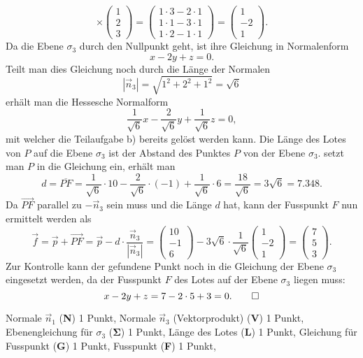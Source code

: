 \begin{loesung}
\[\times
\begin{pmatrix}1\\2\\3\end{pmatrix}
=
\begin{pmatrix}
1\cdot 3 - 2 \cdot 1 \\
1\cdot 1 - 3 \cdot 1\\ 
1\cdot 2 - 1 \cdot 1
\end{pmatrix}
=
\begin{pmatrix}
1\\-2\\1
\end{pmatrix}.
\]
Da die Ebene $\sigma_3$ durch den Nullpunkt geht, ist ihre Gleichung in Normalenform
\[
x-2y+z = 0.
\]
Teilt man dies Gleichung noch durch die Länge der Normalen
\[
|\vec n_3|
=
\sqrt{1^2+2^2 + 1^2}=\sqrt{6} 
\]
erhält man die Hessesche Normalform
\[
\dfrac{1}{\sqrt{6}}x-\dfrac{2}{\sqrt{6}}y+\dfrac{1}{\sqrt{6}}z = 0,
\]
mit welcher die Teilaufgabe b) bereits gelöst werden kann.
Die Länge des Lotes von $P$ auf die Ebene $\sigma_3$ ist der Abstand
des Punktes $P$ von der Ebene $\sigma_3$. setzt man $P$ in die Gleichung
ein, erhält man
\[
d = \overline{PF}
=
\dfrac{1}{\sqrt{6}}\cdot 10-\dfrac{2}{\sqrt{6}}\cdot (-1)+\dfrac{1}{\sqrt{6}} \cdot 6
= 
\dfrac{18}{\sqrt{6}}
=
3\sqrt{6}
=
7.348.
\]
Da $\overrightarrow{PF}$ parallel zu $-\vec n_3$ sein muss
und die Länge $d$ hat, kann
der Fusspunkt $F$ nun ermittelt werden als
\[
\vec f = \vec p + \overrightarrow{PF}
= \vec p - d \cdot \dfrac{\vec n_3}{|\vec n_3|}
=
\begin{pmatrix}
10\\ -1\\ 6
\end{pmatrix}
- 3\sqrt{6} \cdot \dfrac{1}{\sqrt{6}}
\begin{pmatrix}
1\\-2\\1
\end{pmatrix}
=
\begin{pmatrix}
7\\5\\3
\end{pmatrix}.
\]
Zur Kontrolle kann der gefundene Punkt noch in die Gleichung der
Ebene $\sigma_3$ eingesetzt werden, da der Fusspunkt $F$ des Lotes 
auf der Ebene $\sigma_3$ liegen muss:
\[
x-2y+z = 7 -2\cdot 5 + 3 = 0.
\qedhere
\]
\end{loesung}

\begin{bewertung}
Normale $\vec n_1$ ({\bf N}) 1 Punkt,
Normale $\vec n_3$ (Vektorprodukt) ({\bf V}) 1 Punkt,
Ebenengleichung für $\sigma_3$ ($\mathbf{\Sigma}$) 1 Punkt,
Länge des Lotes ({\bf L}) 1 Punkt,
Gleichung für Fusspunkt ({\bf G}) 1 Punkt,
Fusspunkt ({\bf F}) 1 Punkt,
\end{bewertung}


